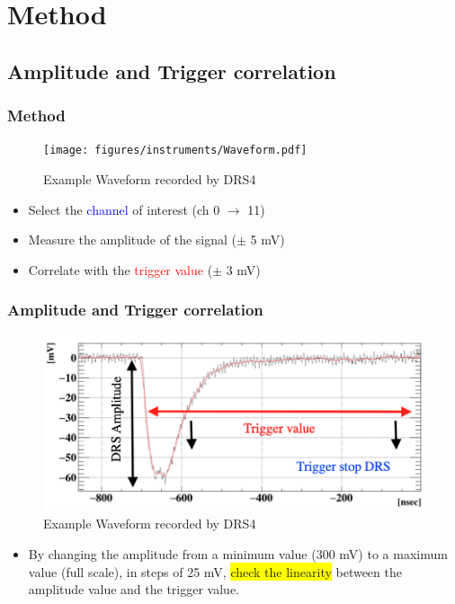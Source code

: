 \documentclass[9pt]{beamer}
\begin{document}
\section{Method}
\subsection{Amplitude and Trigger correlation}
\begin{frame} [fragile]
\small
	\frametitle{Method}
    		\begin{figure}
		 \centering
			\texttt{[image: figures/instruments/Waveform.pdf]}
			\caption{Example Waveform recorded by DRS4}
		\end{figure}
	\begin{itemize}
		\item Select the \textcolor{blue}{channel} of interest (ch 0 $\longrightarrow$ 11)
		\item Measure the amplitude of the signal ($\pm$ 5 mV)
		\item Correlate with the \textcolor{red}{trigger value}  ($\pm$ 3 mV)
	\end{itemize}  
\end{frame}

\begin{frame} [fragile]
\small
	\frametitle{Amplitude and Trigger correlation}
    		\begin{figure}
		 \centering
			\includegraphics[scale=0.3]{figures/instruments/Waveform_trigger.png}
			\caption{Example Waveform recorded by DRS4}
		\end{figure}  
	\begin{itemize}
		\item By changing the amplitude from a minimum value (300 mV) to a maximum value (full scale), in steps of 25 mV, \colorbox{yellow}{check the linearity} between the amplitude value and the trigger value.
	\end{itemize}
\end{frame}
\end{document}
